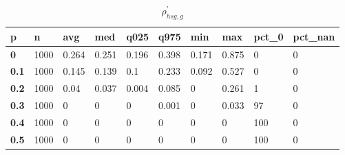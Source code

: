 \begin{table}[h]
 \centering 
\footnotesize
\caption{$\rho_{hsg,g}^\prime $}
\label{tab:alphahsgg}
\begin{tabular}[h]{|l|l|l|l|l|l|l|l|l|l|
    } \hline
\textbf{ p} & \textbf{ n} & \textbf{ avg} & \textbf{ med} & \textbf{ q025} & \textbf{ q975} & \textbf{ min} & \textbf{ max} & \textbf{ pct\_0} & \textbf{ pct\_nan}
    \\ \hline
  \textbf{  0} & 1000 & 0.264 & 0.251 & 0.196 & 0.398 & 0.171 & 0.875 &   0 & 0
    \\ \hline
  \textbf{0.1} & 1000 & 0.145 & 0.139 &   0.1 & 0.233 & 0.092 & 0.527 &   0 & 0
    \\ \hline
  \textbf{0.2} & 1000 &  0.04 & 0.037 & 0.004 & 0.085 &     0 & 0.261 &   1 & 0
    \\ \hline
  \textbf{0.3} & 1000 &     0 &     0 &     0 & 0.001 &     0 & 0.033 &  97 & 0
    \\ \hline
  \textbf{0.4} & 1000 &     0 &     0 &     0 &     0 &     0 &     0 & 100 & 0
    \\ \hline
  \textbf{0.5} & 1000 &     0 &     0 &     0 &     0 &     0 &     0 & 100 & 0
    \\ \hline
 \end{tabular}
 \end{table}
